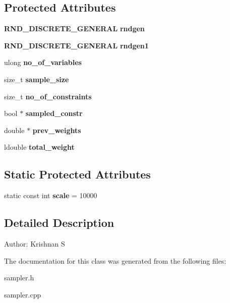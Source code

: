 \subsection*{Protected Attributes}
\begin{CompactItemize}
\item 
{\bf RND\_\-DISCRETE\_\-GENERAL} \textbf{rndgen}\label{classSAMPLER_1e91de1b82889bcd17b8bd0882be35a0}

\item 
{\bf RND\_\-DISCRETE\_\-GENERAL} \textbf{rndgen1}\label{classSAMPLER_57d986b05de57fcff7d779c8df885355}

\item 
ulong \textbf{no\_\-of\_\-variables}\label{classSAMPLER_4fe5a6bfdd10c8a1ae3f364d20ec4267}

\item 
size\_\-t \textbf{sample\_\-size}\label{classSAMPLER_dc15720ec2c1ea57d000e614e783d79d}

\item 
size\_\-t \textbf{no\_\-of\_\-constraints}\label{classSAMPLER_a105911bd2700f1bef3992c480153a3c}

\item 
bool $\ast$ \textbf{sampled\_\-constr}\label{classSAMPLER_98b98beda2cbc4c1bfadbc92e8a17742}

\item 
double $\ast$ \textbf{prev\_\-weights}\label{classSAMPLER_72ade2381bb7fcb367088717cb5dcfaf}

\item 
ldouble \textbf{total\_\-weight}\label{classSAMPLER_75a50a5c23b2cbc24bc14a2cdcd6e4c3}

\end{CompactItemize}
\subsection*{Static Protected Attributes}
\begin{CompactItemize}
\item 
static const int \textbf{scale} = 10000\label{classSAMPLER_c7d1967c0d4dbaca474be581e4bd631d}

\end{CompactItemize}


\subsection{Detailed Description}
\begin{Desc}
\item[Author:]Krishnan S \end{Desc}




The documentation for this class was generated from the following files:\begin{CompactItemize}
\item 
sampler.h\item 
sampler.cpp\end{CompactItemize}

